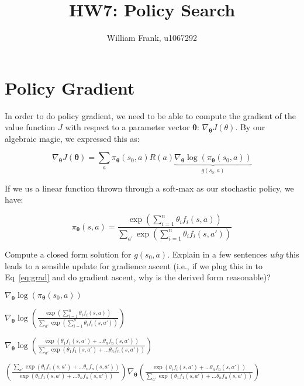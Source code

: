 \documentclass[fleqn]{hermans-hw}
\title{HW7: Policy Search}
\institute{University of Utah}
\author{William Frank, u1067292}
\begin{document}
\maketitle

\section{Policy Gradient}

In order to do policy gradient, we need to be able
to compute the gradient of the value function $J$ with respect
to a parameter vector ${\mathbf \theta}$: $\nabla_{\mathbf \theta} J(\theta)$.  By
our algebraic magic, we expressed this as:

\begin{equation} \label{eq:grad}
\nabla_{\mathbf \theta} J(\mathbf \theta) 
  = \sum_a \pi_{\mathbf \theta}(s_0,a) R(a) 
             \underbrace{\nabla_{\mathbf \theta} \log \left( \pi_{\mathbf \theta}(s_0,a) \right)}_{g(s_0,a)}
\end{equation}

If we us a linear function thrown through a soft-max as our stochastic
policy, we have:

\begin{equation}
\pi_{\mathbf \theta}(s,a) 
  = \frac {\exp \left( \sum_{i=1}^n \theta_i f_i(s,a) \right)}
          {\sum_{a'} \exp \left( \sum_{i=1}^n \theta_i f_i(s,a') \right)}
\end{equation}

Compute a closed form solution for $g(s_0,a)$.  Explain in a few
sentences \emph{why} this leads to a sensible update for gradience
ascent (i.e., if we plug this in to Eq~\eqref{eq:grad} and do gradient
ascent, why is the derived form reasonable)?

$\nabla_{\mathbf \theta} \log \left( \pi_{\mathbf \theta}(s_0,a) \right)$

$\nabla_{\mathbf \theta} \log \left( \frac {\exp \left( \sum_{i=1}^n \theta_i f_i(s,a) \right)}
{\sum_{a'} \exp \left( \sum_{i=1}^n \theta_i f_i(s,a') \right)} \right)$

$\nabla_{\mathbf \theta} \log \left( \frac {\exp \left( \theta_1 f_1(s,a') + \ldots \theta_n f_n(s,a') \right)}
{\sum_{a'} \exp \left( \theta_1 f_1(s,a') + \ldots \theta_n f_n(s,a') \right)} \right)$

$ \left( \frac {\sum_{a'} \exp \left( \theta_1 f_1(s,a') + \ldots \theta_n f_n(s,a') \right)}
{ \exp \left( \theta_1 f_1(s,a') + \ldots \theta_n f_n(s,a') \right)} \right) \nabla_{\mathbf \theta} \left( \frac {\exp \left( \theta_i f_i(s,a') + \ldots \theta_n f_n(s,a') \right)}
{\sum_{a'} \exp \left( \theta_1 f_1(s,a') + \ldots \theta_n f_n(s,a') \right)} \right)$
\end{document}
